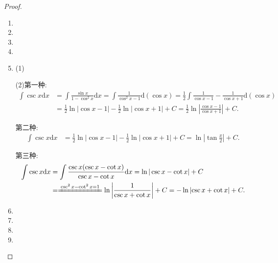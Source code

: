 \documentclass[../../main.tex]{subfiles}
\begin{document}
\begin{proof}
\begin{enumerate}
\item 

\item 

\item 

\item 

\item (1)

(2)第一种:
\begin{align*}
\int \csc x \mathrm{d}x &= \int \frac{\sin x}{1 - \cos^2 x} \mathrm{d}x = \int \frac{1}{\cos^2 x - 1} \mathrm{d}(\cos x) = \frac{1}{2}
\int \frac{1}{\cos x - 1} - \frac{1}{\cos x + 1} \mathrm{d}(\cos x) \\
&= \frac{1}{2}\ln|\cos x - 1| - \frac{1}{2}\ln|\cos x + 1| + C=\frac{1}{2}\ln \left| \frac{\cos x-1}{\cos x+1} \right|+C.
\end{align*}

第二种:
\begin{align*}
\int \csc x \mathrm{d}x &= \frac{1}{2}\ln|\cos x - 1| - \frac{1}{2}\ln|\cos x + 1| + C = \ln|\tan \frac{x}{2}| + C.
\end{align*}

第三种:
\begin{align*}
\int \csc x \mathrm{d}x &= \int \frac{\csc x(\csc x - \cot x)}{\csc x - \cot x} \mathrm{d}x = \ln|\csc x - \cot x| + C\\
&=\xlongequal{\csc ^2x-\cot ^2x=1}\ln \left| \frac{1}{\csc x+\cot x} \right|+C
=-\ln \left| \csc x+\cot x \right|+C.
\end{align*}

\item 

\item 

\item 

\item 
\end{enumerate}

\end{proof}
\end{document}
